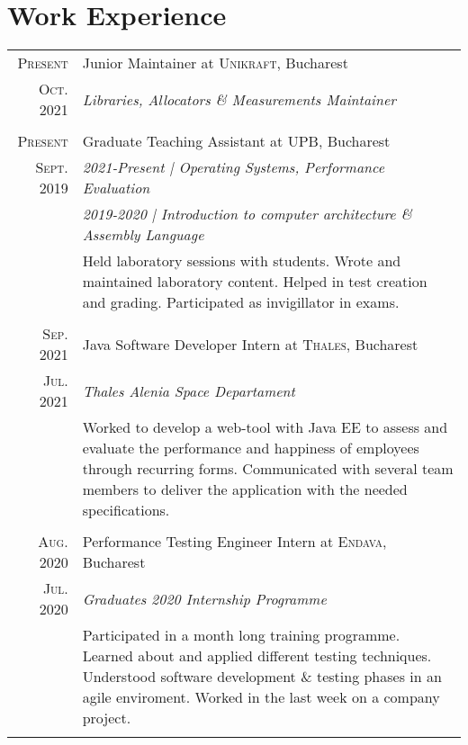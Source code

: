 \documentclass[a4paper,10pt]{article}
\begin{document}
\section{Work Experience}
\begin{tabular}{r|p{11cm}}
	\textsc{Present} & Junior Maintainer at \textsc{Unikraft}, Bucharest \\
	\textsc{Oct. 2021} & \emph{Libraries, Allocators \& Measurements Maintainer} \\
	\multicolumn{2}{c}{} \\

	\textsc{Present} & Graduate Teaching Assistant at \textsc{UPB}, Bucharest \\
	\textsc{Sept. 2019} & \emph{2021-Present | Operating Systems, Performance Evaluation} \\&
	\emph{2019-2020 | Introduction to computer architecture \& Assembly Language} \\&
	\footnotesize
	{
		Held laboratory sessions with students.
		Wrote and maintained laboratory content.
		Helped in test creation and grading.
		Participated as invigillator in exams.
	} \\
	\multicolumn{2}{c}{} \\

	\textsc{Sep. 2021} & Java Software Developer Intern at \textsc{Thales}, Bucharest \\
	\textsc{Jul. 2021} & \emph{Thales Alenia Space Departament}\\&
	\footnotesize
	{
		Worked to develop a web-tool with Java EE to assess and evaluate
		the performance and happiness of employees through recurring forms.
		Communicated with several team members to deliver the application
		with the needed specifications.
	} \\
	\multicolumn{2}{c}{} \\

	\textsc{Aug. 2020} & Performance Testing Engineer Intern at \textsc{Endava}, Bucharest \\
	\textsc{Jul. 2020}&\emph{Graduates 2020 Internship Programme}\\&
	\footnotesize
	{
		Participated in a month long training programme.
		Learned about and applied different testing techniques.
		Understood software development \& testing phases in an agile enviroment.
		Worked in the last week on a company project.
	} \\
	\multicolumn{2}{c}{} \\
\end{tabular}
\end{document}
